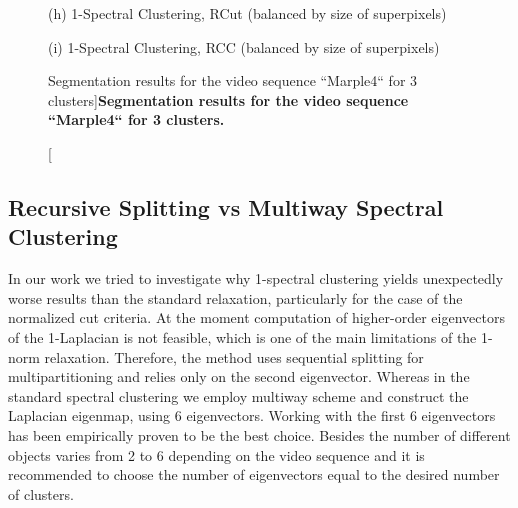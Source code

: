\begin{figure}[ht!]
\begin{minipage}[t]{1\textwidth}
\footnotesize (h) 1-Spectral Clustering, RCut (balanced by size of superpixels)
\end{minipage}
\begin{minipage}[t]{1\textwidth}
\centering
\hfill \hfill  \hfill
\hfill
{}
\hfill
{}
\hfill
{}
\hfill \hfill  \hfill

\footnotesize (i) 1-Spectral Clustering, RCC (balanced by size of superpixels)
\end{minipage}
 \caption[Segmentation results for the video sequence ``Marple4`` for 3 clusters]{
  {\bf Segmentation results for the video sequence ``Marple4`` for 3 clusters.}}
\label{fig:seg_res_M4}
\end{figure}

\clearpage
\newpage
\subsection{Recursive Splitting vs Multiway Spectral Clustering}
In our work we tried to investigate why 1-spectral clustering yields unexpectedly worse results than the standard relaxation, particularly for the case of the normalized cut criteria.
At the moment computation of higher-order eigenvectors of the 1-Laplacian is not feasible, which is one of the main limitations of the 1-norm relaxation. Therefore, the method 
uses sequential splitting for multipartitioning and relies only on the second eigenvector. Whereas in the standard spectral clustering we employ multiway scheme and construct the Laplacian eigenmap, using 6 eigenvectors. 
Working with the first 6 eigenvectors has been empirically proven to be the best choice. Besides the number of different objects varies from 2 to 6 depending on the video sequence and it is recommended to choose the
number of eigenvectors equal to the desired number of clusters. 

